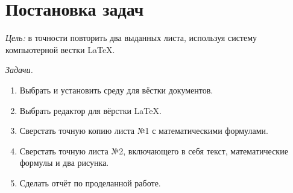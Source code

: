 \documentclass[a4paper, final]{article}
\begin{document}


{
\section{Постановка задач}
\par \textit{Цель:} в точности повторить два выданных листа, используя систему компьютерной вестки \LaTeX. \\
\par \textit{Задачи.}
\begin{enumerate}
    \item Выбрать и установить среду для вёстки документов.
    \item Выбрать редактор для вёрстки \LaTeX.
    \item Сверстать точную копию листа №1 с математическими формулами.
    \item Сверстать точную листа №2, включающего в себя текст, математические формулы и два рисунка.
    \item Сделать отчёт по проделанной работе.
\end{enumerate}
\newpage
}
\end{document}
